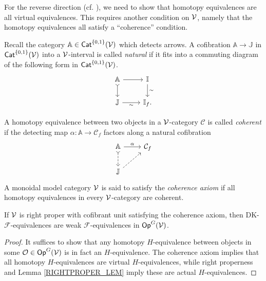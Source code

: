 \documentclass[a4paper,10pt
,draft
]{article}%
\renewcommand{\F}{\mathcal F}
\newcommand{\I}{\mathbb I}
\newcommand{\J}{\mathbb J}
\renewcommand{\1}{\eta}%
\begin{document}
For the reverse direction (cf. \cite[\S 2]{BM13}), we need to show that
homotopy equivalences are all virtual equivalences.
This requires another condition on $\mathcal V$, namely that the homotopy equivalences all satisfy a ``coherence'' condition.

\begin{definition}
      Recall the category $\mathbb A \in \mathsf{Cat}^{\left\{0,1\right\}}(\mathcal V)$ which detects arrows.
      A cofibration $\mathbb A \to \J$ in $\mathsf{Cat}^{\left\{0,1\right\}}(\mathcal V)$ into a $\mathcal V$-interval is called \textit{natural} if
      it fits into a commuting diagram of the following form in $\mathsf{Cat}^{\left\{0,1\right\}}(\mathcal V)$.
      \begin{equation}
            \begin{tikzcd}
                  \mathbb A \arrow[d, tail] \arrow[r]
                  &
                  \I \arrow[d, "\sim"]
                  \\
                  \J \arrow[r, "\sim"']
                  &
                  \I_f.
            \end{tikzcd}
      \end{equation}

      A homotopy equivalence between two objects in a $\mathcal V$-category $\mathcal C$ is called \textit{coherent} if
      the detecting map $\alpha: \mathbb A \to \mathcal C_f$ factors along a natural cofibration
      \begin{equation}
            \begin{tikzcd}
                  \mathbb A \arrow[r, "\alpha"] \arrow[d, tail, dashed]
                  &
                  \mathcal C_f
                  \\
                  \J \arrow[ur, dashed]
            \end{tikzcd}
      \end{equation}
      A monoidal model category $\mathcal V$ is said to satisfy the \textit{coherence axiom} if
      all homotopy equivalences in every $\mathcal V$-category are coherent.
\end{definition}

\begin{proposition}[{cf. \cite[Prop. 2.20]{BM13}}]
      \label{COH_DK_ARE_WE_PROP}
      If $\mathcal V$ is right proper with cofibrant unit satisfying the coherence axiom, then
      DK-$\F$-equivalences are weak $\F$-equivalences in $\mathsf{Op}^G(\mathcal V)$.
\end{proposition}
\begin{proof}
      It suffices to show that any homotopy $H$-equivalence between objects in some $\mathcal{O} \in \mathsf{Op}^G(\mathcal V)$
      is in fact an $H$-equivalence.
      The coherence axiom implies that all homotopy $H$-equivalences are virtual $H$-equivalences,
      while right properness and Lemma \ref{RIGHTPROPER_LEM} imply these are actual $H$-equivalences.
\end{proof}
\end{document}
